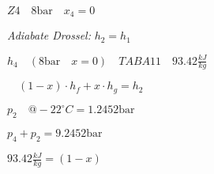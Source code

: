 

\item[c)] \(Z4 \quad 8 \text{bar} \quad x_4 = 0\)
    
    \textit{Adiabate Drossel:} \(h_2 = h_1\)
    
    \(h_4 \quad (8 \text{bar} \quad x = 0) \quad TAB A11 \quad 93.42 \frac{kJ}{kg}\)
    
    \(\quad (1-x) \cdot h_f + x \cdot h_g = h_2\)
    
    \(p_2 \quad @-22^\circ C = 1.2452 \text{bar}\)
    
    \(p_4 + p_2 = 9.2452 \text{bar}\)
    
    \(93.42 \frac{kJ}{kg} = (1-x)\)
